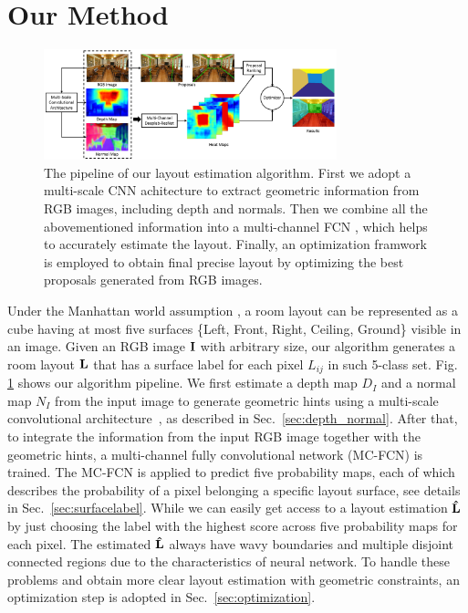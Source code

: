 \section{Our Method}
\label{sec:Meth}



\begin{figure}[!ht]
	\centering
	\includegraphics[width=8.5cm]{figure/ppline.png}
	\caption{The pipeline of our layout estimation algorithm. First we adopt a multi-scale CNN achitecture \cite{eigen2015predicting} to extract geometric information from RGB images, including depth and normals. Then we combine all the abovementioned information into a multi-channel FCN , which helps to accurately estimate the layout. Finally, an optimization framwork is employed to obtain final precise layout by optimizing the best proposals generated from RGB images.}
	\label{fig:pipeline}
\end{figure}

Under the Manhattan world assumption \cite{coughlan1999manhattan}, a room layout can be represented as a cube having at most five surfaces \{Left, Front, Right, Ceiling, Ground\} visible in an image. 
%
Given an RGB image $\mathbf{I}$ with arbitrary size, our algorithm generates a room layout $\mathbf{L}$ that has a surface label for each pixel $L_{ij} $ in such 5-class set. Fig. \ref{fig:pipeline} shows our algorithm pipeline. 
We first estimate a depth map $D_{I}$ and a normal map $N_{I}$ from the input image to generate geometric hints using a multi-scale convolutional architecture~\cite{eigen2015predicting}, as described in Sec.~\ref{sec:depth_normal}.
After that, to integrate the information from the input RGB image together with the geometric hints, a multi-channel fully convolutional network (MC-FCN) is trained. The MC-FCN is applied to predict five probability maps, each of which describes the probability of a pixel belonging a specific layout surface, see details in Sec.~\ref{sec:surfacelabel}.
While we can easily get access to a layout estimation $\mathbf{\hat{L}}$ by just choosing the label with the highest score across five probability maps for each pixel. 
The estimated $\mathbf{\hat{L}}$ always have wavy boundaries and multiple disjoint connected regions due to the characteristics of neural network. To handle these problems and obtain more clear layout estimation with geometric constraints, an optimization step is adopted in Sec.~\ref{sec:optimization}.  
 

